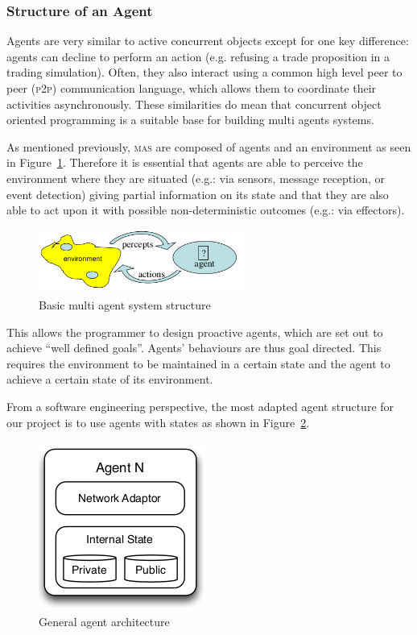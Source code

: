 \subsubsection{Structure of an Agent}

Agents are very similar to active concurrent objects except for one key difference: agents can decline to perform an action (e.g. refusing a trade proposition in a trading simulation). Often, they also interact using a common high level peer to peer (\textsc{p2p}) communication language, which allows them to coordinate their activities asynchronously. These similarities do mean that concurrent object oriented programming is a suitable base for building multi agents systems.

As mentioned previously, \textsc{mas} are composed of agents and an environment as seen in Figure~\ref{fig:mas}. Therefore it is essential that agents are able to perceive the environment where they are situated (e.g.: via sensors, message reception, or event detection) giving partial information on its state and that they are also able to act upon it with possible non-deterministic outcomes (e.g.: via effectors).

\begin{figure}[h!]
	\centering
	\includegraphics[width=0.6\textwidth]{img/mas.png}
	\caption{Basic multi agent system structure}
	\label{fig:mas}
\end{figure}

This allows the programmer to design proactive agents, which are set out to achieve ``well defined goals''. Agents' behaviours are thus goal directed. This requires the environment to be maintained in a certain state and the agent to achieve a certain state of its environment.~\cite{MAS-DoC}

From a software engineering perspective, the most adapted agent structure for our project is to use agents with states as shown in Figure~\ref{fig:agent-architecture}.

\begin{figure}[h!]
	\centering
	\includegraphics[]{img/agent-architecture.png}
	\caption{General agent architecture~\cite{Sam-Transfer-Report}}
	\label{fig:agent-architecture}
\end{figure}

